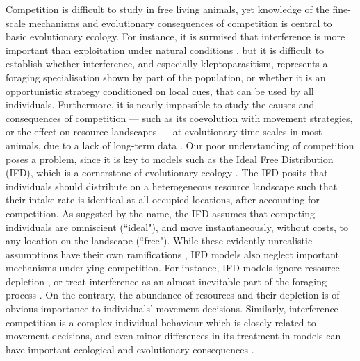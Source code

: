 \documentclass[11pt]{article}
\begin{document}
Competition is difficult to study in free living animals, yet knowledge of the fine-scale mechanisms and evolutionary consequences of competition is central to basic evolutionary ecology.
For instance, it is surmised that interference is more important than exploitation under natural conditions \citep[see][]{case1974}, but it is difficult to establish whether interference, and especially kleptoparasitism, represents a foraging specialisation shown by part of the population, or whether it is an opportunistic strategy conditioned on local cues, that can be used by all individuals.
Furthermore, it is nearly impossible to study the causes and consequences of competition --- such as its coevolution with movement strategies, or the effect on resource landscapes --- at evolutionary time-scales in most animals, due to a lack of long-term data \citep{clutton-brock2010}.
Our poor understanding of competition poses a problem, since it is key to models such as the Ideal Free Distribution (IFD), which is a cornerstone of evolutionary ecology \citep{fretwell1970}.
The IFD posits that individuals should distribute on a heterogeneous resource landscape such that their intake rate is identical at all occupied locations, after accounting for competition.
As suggsted by the name, the IFD assumes that competing individuals are omniscient (``ideal"), and move instantaneously, without costs, to any location on the landscape (``free").
While these evidently unrealistic assumptions have their own ramifications \citep{tregenza1995,amano2006,matsumura2010,cressman2006}, IFD models also neglect important mechanisms underlying competition.
For instance, IFD models ignore resource depletion \citep{fretwell1970,vandermeer1997,cressman2006}, or treat interference as an almost inevitable part of the foraging process \citep[reviewed in][see also \citealt{cressman2006, garay2020}]{vandermeer1997, tregenza1995}.
On the contrary, the abundance of resources and their depletion is of obvious importance to individuals' movement decisions.
Similarly, interference competition is a complex individual behaviour which is closely related to movement decisions, and even minor differences in its treatment in models can have important ecological and evolutionary consequences \citep{vandermeer1997}.
\end{document}
